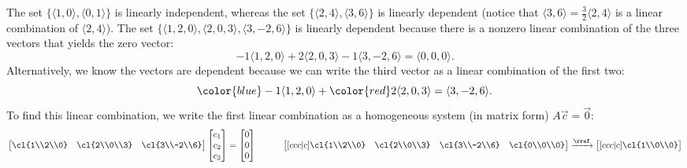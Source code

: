 \begin{example}\label{first linearly independent example}
The set $\{\langle1,0\rangle, \langle0,1\rangle\}$ is linearly independent, whereas the set $\{\langle2,4\rangle, \langle3,6\rangle\}$ is linearly dependent (notice that $\langle3,6\rangle = \frac{3}{2}\langle2,4\rangle$ is a linear combination of $\langle2,4\rangle$). The set $\{\langle1,2,0\rangle, \langle2,0,3\rangle, \langle3,-2,6\rangle\}$ is linearly dependent because there is a nonzero linear combination of the three vectors that yields the zero vector:
$$-1\langle1,2,0\rangle+2\langle2,0,3\rangle-1\langle3,-2,6\rangle=\langle0,0,0\rangle.$$ 
Alternatively, we know the vectors are dependent because we can write the third vector as a linear combination of the first two:
$${\color{blue}-1}\langle1,2,0\rangle+{\color{red}2}\langle2,0,3\rangle=\langle3,-2,6\rangle.$$ 
To find this linear combination, we write the first linear combination as a homogeneous system (in matrix form) $A\vec c=\vec 0$:  
$$\begin{bmatrix}
\cl{1\\2\\0}
&\cl{2\\0\\3}
&\cl{3\\-2\\6}
\end{bmatrix}
\begin{bmatrix}
c_1\\c_2\\c_3
\end{bmatrix}
=
\begin{bmatrix}
0\\0\\0
\end{bmatrix}
\quad\quad\quad
\begin{bmatrix}[ccc|c]
\cl{1\\2\\0}
&\cl{2\\0\\3}
&\cl{3\\-2\\6}
&\cl{0\\0\\0}
\end{bmatrix}
\xrightarrow{\rref}
\begin{bmatrix}[ccc|c]
\cl{1\\0\\0}

\end{bmatrix}$$
\end{example}
